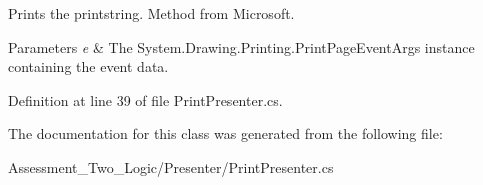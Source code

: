 Prints the printstring. Method from Microsoft. 


\begin{DoxyParams}{Parameters}
{\em e} & The System.Drawing.Printing.PrintPageEventArgs instance containing the event data.\\
\hline
\end{DoxyParams}


Definition at line 39 of file PrintPresenter.cs.



The documentation for this class was generated from the following file:\begin{DoxyCompactItemize}
\item 
Assessment\_\-Two\_\-Logic/Presenter/PrintPresenter.cs\end{DoxyCompactItemize}
